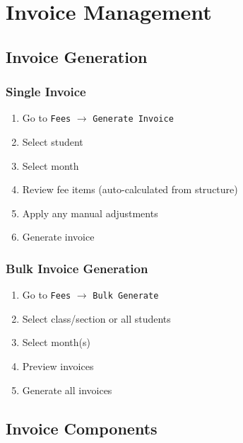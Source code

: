 \documentclass[12pt,a4paper]{report}
\begin{document}
\chapter{Invoice Management}

\section{Invoice Generation}

\subsection{Single Invoice}

\begin{enumerate}[leftmargin=*]
    \item Go to \texttt{Fees} $\rightarrow$ \texttt{Generate Invoice}
    \item Select student
    \item Select month
    \item Review fee items (auto-calculated from structure)
    \item Apply any manual adjustments
    \item Generate invoice
\end{enumerate}

\subsection{Bulk Invoice Generation}

\begin{enumerate}[leftmargin=*]
    \item Go to \texttt{Fees} $\rightarrow$ \texttt{Bulk Generate}
    \item Select class/section or all students
    \item Select month(s)
    \item Preview invoices
    \item Generate all invoices
\end{enumerate}

\section{Invoice Components}
\end{document}
